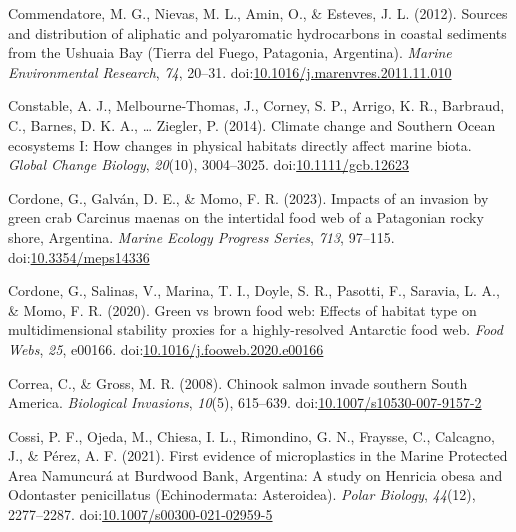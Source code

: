 \documentclass[
]{article}
\newlength{\cslhangindent}
\newlength{\cslentryspacingunit} %
\newenvironment{CSLReferences}[2] %
 {%
  \setlength{\parindent}{0pt}
  \ifodd #1
  \let\oldpar\par
  \def\par{\hangindent=\cslhangindent\oldpar}
  \fi
  \setlength{\parskip}{#2\cslentryspacingunit}
 }%
 {}
\begin{document}
\begin{CSLReferences}{1}{0}
\leavevmode{}%
Commendatore, M. G., Nievas, M. L., Amin, O., \& Esteves, J. L. (2012).
Sources and distribution of aliphatic and polyaromatic hydrocarbons in
coastal sediments from the {Ushuaia Bay} ({Tierra} del {Fuego},
{Patagonia}, {Argentina}). \emph{Marine Environmental Research},
\emph{74}, 20--31.
doi:\href{https://doi.org/10.1016/j.marenvres.2011.11.010}{10.1016/j.marenvres.2011.11.010}

\leavevmode{}%
Constable, A. J., Melbourne-Thomas, J., Corney, S. P., Arrigo, K. R.,
Barbraud, C., Barnes, D. K. A., \ldots{} Ziegler, P. (2014). Climate
change and {Southern Ocean} ecosystems {I}: How changes in physical
habitats directly affect marine biota. \emph{Global Change Biology},
\emph{20}(10), 3004--3025.
doi:\href{https://doi.org/10.1111/gcb.12623}{10.1111/gcb.12623}

\leavevmode{}%
Cordone, G., Galván, D. E., \& Momo, F. R. (2023). Impacts of an
invasion by green crab {Carcinus} maenas on the intertidal food web of a
{Patagonian} rocky shore, {Argentina}. \emph{Marine Ecology Progress
Series}, \emph{713}, 97--115.
doi:\href{https://doi.org/10.3354/meps14336}{10.3354/meps14336}

\leavevmode{}%
Cordone, G., Salinas, V., Marina, T. I., Doyle, S. R., Pasotti, F.,
Saravia, L. A., \& Momo, F. R. (2020). Green vs brown food web:
{Effects} of habitat type on multidimensional stability proxies for a
highly-resolved {Antarctic} food web. \emph{Food Webs}, \emph{25},
e00166.
doi:\href{https://doi.org/10.1016/j.fooweb.2020.e00166}{10.1016/j.fooweb.2020.e00166}

\leavevmode{}%
Correa, C., \& Gross, M. R. (2008). Chinook salmon invade southern
{South America}. \emph{Biological Invasions}, \emph{10}(5), 615--639.
doi:\href{https://doi.org/10.1007/s10530-007-9157-2}{10.1007/s10530-007-9157-2}

\leavevmode{}%
Cossi, P. F., Ojeda, M., Chiesa, I. L., Rimondino, G. N., Fraysse, C.,
Calcagno, J., \& Pérez, A. F. (2021). First evidence of microplastics in
the {Marine Protected Area Namuncurá} at {Burdwood Bank}, {Argentina}: A
study on {Henricia} obesa and {Odontaster} penicillatus
({Echinodermata}: {Asteroidea}). \emph{Polar Biology}, \emph{44}(12),
2277--2287.
doi:\href{https://doi.org/10.1007/s00300-021-02959-5}{10.1007/s00300-021-02959-5}


\end{CSLReferences}
\end{document}
